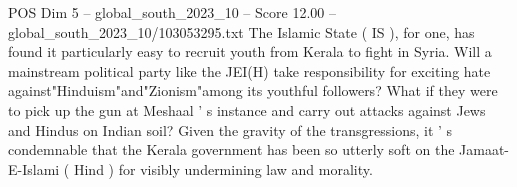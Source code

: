 \begin{textsample}{POS Dim 5 – global\_south\_2023\_10 – Score 12.00 – global\_south\_2023\_10/103053295.txt}
The Islamic State ( IS ), for one, has found it particularly easy to recruit youth from Kerala to fight in Syria.
Will a mainstream political party like the JEI(H) take responsibility for exciting hate against"Hinduism"and"Zionism"among its youthful followers?
What if they were to pick up the gun at Meshaal ' s instance and carry out attacks against Jews and Hindus on Indian soil?
Given the gravity of the transgressions, it ' s condemnable that the Kerala government has been so utterly soft on the Jamaat-E-Islami ( Hind ) for visibly undermining law and morality.

\end{textsample}
